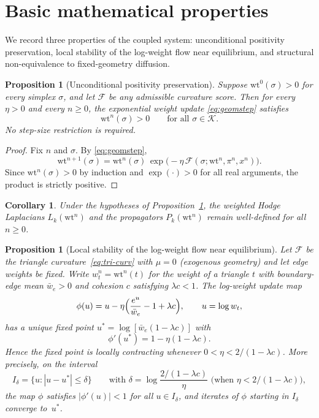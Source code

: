 \documentclass[11pt]{article}
\newtheorem{proposition}[definition]{Proposition}
\newtheorem{corollary}[definition]{Corollary}
\newcommand{\K}{\mathcal{K}}
\newcommand{\wt}{\mathrm{wt}}
\newcommand{\Flow}{\mathcal{F}}
\begin{document}
\section{Basic mathematical properties}

We record three properties of the coupled system: unconditional positivity preservation, local stability of the log-weight flow near equilibrium, and structural non-equivalence to fixed-geometry diffusion.

\begin{proposition}[Unconditional positivity preservation]\label{prop:positivity}
Suppose $\wt^0(\sigma)>0$ for every simplex $\sigma$, and let $\Flow$ be any admissible curvature score.  Then for every $\eta>0$ and every $n\ge 0$, the exponential weight update \eqref{eq:geomstep} satisfies
\[
\wt^n(\sigma)>0 \qquad \text{for all } \sigma\in\K.
\]
No step-size restriction is required.
\end{proposition}

\begin{proof}
Fix $n$ and $\sigma$.  By \eqref{eq:geomstep},
\[
\wt^{n+1}(\sigma)=\wt^n(\sigma)\,\exp\!\bigl(-\eta\,\Flow(\sigma;\wt^n,\pi^n,x^n)\bigr).
\]
Since $\wt^n(\sigma)>0$ by induction and $\exp(\cdot)>0$ for all real arguments, the product is strictly positive.
\end{proof}

\begin{corollary}
Under the hypotheses of Proposition~\ref{prop:positivity}, the weighted Hodge Laplacians $L_k(\wt^n)$ and the propagators $P_k(\wt^n)$ remain well-defined for all $n\ge 0$.
\end{corollary}

\begin{proposition}[Local stability of the log-weight flow near equilibrium]\label{prop:lipschitz}
Let $\Flow$ be the triangle curvature~\eqref{eq:tri-curv} with $\mu=0$ (exogenous geometry) and let edge weights be fixed.  Write $w_t^n=\wt^n(t)$ for the weight of a triangle $t$ with boundary-edge mean $\bar w_e>0$ and cohesion $c$ satisfying $\lambda c<1$.  The log-weight update map
\[
\phi(u) = u - \eta\Bigl(\frac{e^u}{\bar w_e}-1+\lambda c\Bigr), \qquad u=\log w_t,
\]
has a unique fixed point $u^\ast=\log[\bar w_e(1-\lambda c)]$ with
\[
\phi'(u^\ast) = 1 - \eta(1-\lambda c).
\]
Hence the fixed point is locally contracting whenever $0<\eta<2/(1-\lambda c)$.  More precisely, on the interval
\[
I_\delta = \{u : |u-u^\ast|\le \delta\}
\qquad\text{with } \delta = \log\frac{2/(1-\lambda c)}{\eta} \text{ (when }\eta<2/(1{-}\lambda c)),
\]
the map $\phi$ satisfies $|\phi'(u)|<1$ for all $u\in I_\delta$, and iterates of $\phi$ starting in $I_\delta$ converge to~$u^\ast$.
\end{proposition}
\end{document}
